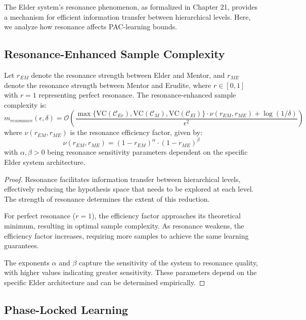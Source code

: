 The Elder system's resonance phenomenon, as formalized in Chapter 21, provides a mechanism for efficient information transfer between hierarchical levels. Here, we analyze how resonance affects PAC-learning bounds.

\subsection{Resonance-Enhanced Sample Complexity}

\begin{theorem}
Let $r_{EM}$ denote the resonance strength between Elder and Mentor, and $r_{ME}$ denote the resonance strength between Mentor and Erudite, where $r \in [0, 1]$ with $r = 1$ representing perfect resonance. The resonance-enhanced sample complexity is:
\begin{equation}
m_{resonance}(\epsilon, \delta) = \mathcal{O}\left(\frac{\max\{\text{VC}(\mathcal{C}_{Er}), \text{VC}(\mathcal{C}_{M}), \text{VC}(\mathcal{C}_{El})\} \cdot \nu(r_{EM}, r_{ME}) + \log(1/\delta)}{\epsilon^2}\right)
\end{equation}
where $\nu(r_{EM}, r_{ME})$ is the resonance efficiency factor, given by:
\begin{equation}
\nu(r_{EM}, r_{ME}) = (1 - r_{EM})^{\alpha} \cdot (1 - r_{ME})^{\beta}
\end{equation}
with $\alpha, \beta > 0$ being resonance sensitivity parameters dependent on the specific Elder system architecture.
\end{theorem}

\begin{proof}
Resonance facilitates information transfer between hierarchical levels, effectively reducing the hypothesis space that needs to be explored at each level. The strength of resonance determines the extent of this reduction.

For perfect resonance ($r = 1$), the efficiency factor approaches its theoretical minimum, resulting in optimal sample complexity. As resonance weakens, the efficiency factor increases, requiring more samples to achieve the same learning guarantees.

The exponents $\alpha$ and $\beta$ capture the sensitivity of the system to resonance quality, with higher values indicating greater sensitivity. These parameters depend on the specific Elder architecture and can be determined empirically.
\end{proof}

\subsection{Phase-Locked Learning}

